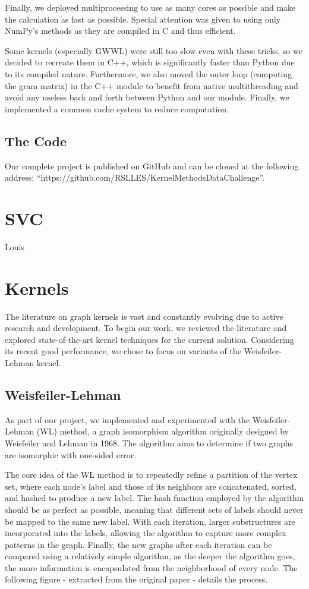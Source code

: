 \documentclass{IEEEtran}
\begin{document}
Finally, we deployed multiprocessing to use as many cores as possible and make the calculation as fast as possible. Special attention was given to using only NumPy's methods as they are compiled in C and thus efficient.

Some kernels (especially GWWL) were still too slow even with these tricks, so we decided to recreate them in C++, which is significantly faster than Python due to its compiled nature. Furthermore, we also moved the outer loop (computing the gram matrix) in the C++ module to benefit from native multithreading and avoid any useless back and forth between Python and our module. Finally, we implemented a common cache system to reduce computation.

\subsection{The Code}
Our complete project is published on GitHub and can be cloned at the following address: ``https://github.com/RSLLES/KernelMethodsDataChallenge''.
\section{SVC}

Louis


\section{Kernels}

The literature on graph kernels is vast and constantly evolving due to active research and development. To begin our work, we reviewed the literature and explored state-of-the-art kernel techniques for the current solution. Considering its recent good performance,
we chose to focus on variants of the Weisfeiler-Lehman kernel.

\subsection{Weisfeiler-Lehman}
As part of our project, we implemented and experimented with the Weisfeiler-Lehman (WL) method, a graph isomorphism algorithm originally designed by Weisfeiler and Lehman in 1968. The algorithm aims to determine if two graphs are isomorphic with one-sided error.

The core idea of the WL method is to repeatedly refine a partition of the vertex set, where each node's label and those of its neighbors are concatenated, sorted, and hashed to produce a new label. The hash function employed by the algorithm should be as perfect as possible, meaning that different sets of labels should never be mapped to the same new label. With each iteration, larger substructures are incorporated into the labels, allowing the algorithm to capture more complex patterns in the graph. Finally, the new graphs after each iteration can be compared using a relatively simple algorithm, as the deeper the algorithm goes, the more information is encapsulated from the neighborhood of every node.
The following figure - extracted from the original paper - details the process.
\end{document}
